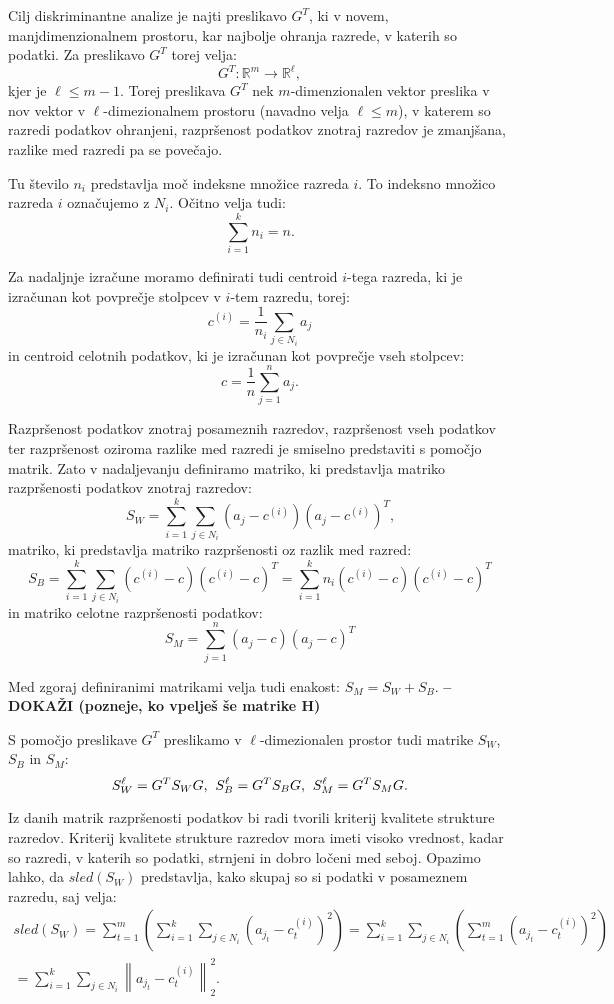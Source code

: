 \documentclass[mat1]{article}
\newcommand{\norm}[1]{\left\lVert#1\right\rVert}
\begin{document}
Cilj diskriminantne analize je najti preslikavo $G^T$, ki v novem, manjdimenzionalnem prostoru, kar najbolje ohranja razrede, v katerih so podatki.
Za preslikavo $G^T$ torej velja: $$G^T : \mathbb{R}^m \rightarrow \mathbb{R}^\ell ,$$ kjer je $\ell \leq m - 1$. Torej preslikava $G^T$ nek $m$-dimenzionalen vektor preslika v nov vektor v $\ell$-dimezionalnem prostoru (navadno velja $\ell \leq m$), v katerem so razredi podatkov ohranjeni, razpršenost podatkov znotraj razredov je zmanjšana, razlike med razredi pa se povečajo.

Tu število $n_i$ predstavlja moč indeksne množice razreda $i$. To indeksno množico razreda $i$ označujemo z $N_i$. Očitno velja tudi: $$
\sum_{i=1}^{k}n_i = n \text{.}$$

Za nadaljnje izračune moramo definirati tudi centroid $i$-tega razreda, ki je izračunan kot povprečje stolpcev v $i$-tem razredu, torej: 
$$c^{(i)} = \frac{1}{n_i} \sum_{j \in N_i} a_j
$$
in centroid celotnih podatkov, ki je izračunan kot povprečje vseh stolpcev:
$$c = \frac{1}{n} \sum_{j = 1}^{n} a_j \text{.}
$$

Razpršenost podatkov znotraj posameznih razredov, razpršenost vseh podatkov ter razpršenost oziroma razlike med razredi je smiselno predstaviti s pomočjo matrik. Zato v nadaljevanju definiramo matriko, ki predstavlja matriko razpršenosti podatkov znotraj razredov:
$$S_W = \sum_{i = 1}^{k} \sum_{j \in N_i}(a_j - c^{(i)})(a_j - c^{(i)})^T\text{,}$$
matriko, ki predstavlja matriko razpršenosti oz razlik med razred:
$$S_B = \sum_{i = 1}^{k} \sum_{j \in N_i} ( c^{(i)} - c)( c^{(i)} - c)^T = \sum_{i = 1}^{k} n_i ( c^{(i)} - c)( c^{(i)} - c)^T$$
in matriko celotne razpršenosti podatkov:
$$S_M = \sum_{j = 1}^{n} (a_j - c)(a_j - c)^T$$

Med zgoraj definiranimi matrikami velja tudi enakost:
$S_M = S_W + S_B \text{.}$ \textbf{-- DOKAŽI (pozneje, ko vpelješ še matrike H)}

S pomočjo preslikave $G^T$ preslikamo v $\ell$-dimezionalen prostor tudi matrike $S_W$, $S_B$ in $S_M$:
$$ S_{W}^{\ell} = G^T S_W G \text{,} \hspace{2mm} S_{B}^{\ell} = G^T S_B G \text{,} \hspace{2mm} S_{M}^{\ell} = G^T S_M G \text{.}
$$

Iz danih matrik razpršenosti podatkov bi radi tvorili kriterij kvalitete strukture razredov. Kriterij kvalitete strukture razredov mora imeti visoko vrednost, kadar so razredi, v katerih so podatki, strnjeni in dobro ločeni med seboj. Opazimo lahko, da $sled(S_W)$ predstavlja, kako skupaj so si podatki v posameznem razredu, saj velja:
\begin{gather*} 
sled(S_W) = \sum_{t=1}^{m} (\sum_{i = 1}^{k} \sum_{j \in N_i}(a_{j_t} - c_t^{(i)})^2)
= \sum_{i = 1}^{k} \sum_{j \in N_i} ( \sum_{t=1}^{m} (a_{j_t} - c_t^{(i)})^2) \\
= \sum_{i = 1}^{k} \sum_{j \in N_i} \norm{ a_{j_t} - c_t^{(i)}}_2^2 \text{.}
\end{gather*}
\end{document}
